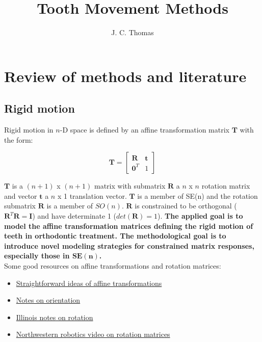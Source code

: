 \documentclass[11pt]{article}
\title{Tooth Movement Methods}
\author{J. C. Thomas}
\theoremstyle{definition}
\begin{document}
\maketitle


\section{Review of methods and literature}

\subsection{Rigid motion}

\noindent Rigid motion in $n$-D space is defined by an affine transformation matrix $\mathbf{T}$ with the form:

$$\mathbf{T} = \begin{bmatrix}
\mathbf{R} & \mathbf{t} \\
\mathbf{0}^T & 1
\end{bmatrix}$$


\noindent $\mathbf{T}$ is a $(n+1)$ x $(n+1)$ matrix with submatrix $\mathbf{R}$ a $n$ x $n$ rotation matrix and vector $\mathbf{t}$ a $n$ x 1 translation vector. $\mathbf{T}$ is a member of SE(n) and the rotation submatrix $\mathbf{R}$ is a member of $SO(n)$. $\mathbf{R}$ is constrained to be orthogonal ($\mathbf{R}^T\mathbf{R} = \mathbf{I}$) and have determinate 1 ($det(\mathbf{R}) = 1$). \textbf{The applied goal is to model the affine transformation matrices defining the rigid motion of teeth in orthodontic treatment. The methodological goal is to introduce novel modeling strategies for constrained matrix responses, especially those in $\mathbf{SE}(\mathbf{n})$.} \\

\noindent Some good resources on affine transformations and rotation matrices:
\begin{itemize}
    \item \href{https://www.brainvoyager.com/bv/doc/UsersGuide/CoordsAndTransforms/SpatialTransformationMatrices.html}{Straightforward ideas of affine transformations}
    \item \href{https://github.com/madibabaiasl/modern-robotics-course/wiki/Lesson-3:-Orientation-in-Robotics-%E2%80%90-Rotation-Matrices}{Notes on orientation}
    \item \href{https://motion.cs.illinois.edu/RoboticSystems/3DRotations.html}{Illinois notes on rotation}
    \item \href{https://modernrobotics.northwestern.edu/nu-gm-book-resource/3-2-1-rotation-matrices-part-1-of-2/}{Northwestern robotics video on rotation matrices}
\end{itemize}
\end{document}
